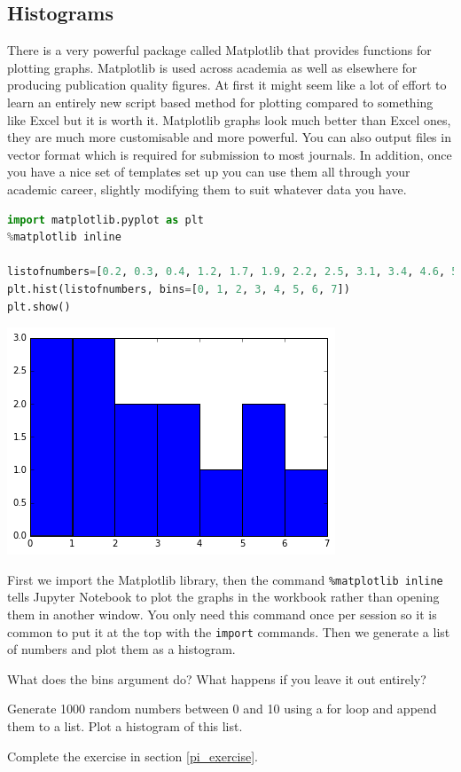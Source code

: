 	\subsection{Histograms}
		There is a very powerful package called Matplotlib that provides functions for plotting graphs. Matplotlib is used across academia as well as elsewhere for producing publication quality figures. At first it might seem like a lot of effort to learn an entirely new script based method for plotting compared to something like Excel but it is worth it. Matplotlib graphs look much better than Excel ones, they are much more customisable and more powerful. You can also output files in vector format which is required for submission to most journals. In addition, once you have a nice set of templates set up you can use them all through your academic career, slightly modifying them to suit whatever data you have.
		\begin{lstlisting}[language=Python]
import matplotlib.pyplot as plt
%matplotlib inline

listofnumbers=[0.2, 0.3, 0.4, 1.2, 1.7, 1.9, 2.2, 2.5, 3.1, 3.4, 4.6, 5.1, 5.6, 6.0, 7.4, 7.4, 7.6]
plt.hist(listofnumbers, bins=[0, 1, 2, 3, 4, 5, 6, 7])
plt.show()\end{lstlisting}
		\includegraphics[scale=0.8]{images/histogram}

		First we import the Matplotlib library, then the command \texttt{\%matplotlib inline} tells Jupyter Notebook to plot the graphs in the workbook rather than opening them in another window. You only need this command once per session so it is common to put it at the top with the \texttt{import} commands. Then we generate a list of numbers and plot them as a histogram.
		\begin{task}What does the bins argument do? What happens if you leave it out entirely?\end{task}
		\begin{task}Generate 1000 random numbers between 0 and 10 using a for loop and append them to a list. Plot a histogram of this list.\end{task}
		\begin{task}Complete the exercise in section \ref{pi_exercise}.\end{task}

